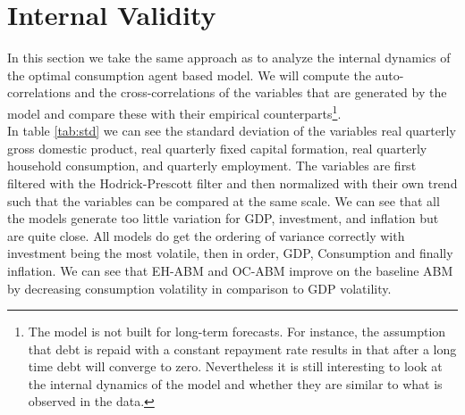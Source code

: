 
\section{Internal Validity} %

\label{Sensitivity Analysis} %
In this section we take the same approach as \cite{caiani_agent_2016} to analyze the internal dynamics of the optimal consumption agent based model. We will compute the auto-correlations and the cross-correlations of the variables that are generated by the model and compare these with their empirical counterparts\footnote{The model is not built for long-term forecasts. For instance, the assumption that debt is repaid with a constant repayment rate results in that after a long time debt will converge to zero. Nevertheless it is still interesting to look at the internal dynamics of the model and whether they are similar to what is observed in the data.}. \\

In table \ref{tab:std} we can see the standard deviation of the variables real quarterly gross domestic product, real quarterly fixed capital formation, real quarterly household consumption, and quarterly employment. The variables are first filtered with the Hodrick-Prescott filter and then normalized with their own trend such that the variables can be compared at the same scale. We can see that all the models generate too little variation for GDP, investment, and inflation but are quite close. All models do get the ordering of variance correctly with investment being the most volatile, then in order, GDP, Consumption and finally inflation. We can see that EH-ABM and OC-ABM improve on the baseline ABM by decreasing consumption volatility in comparison to GDP volatility.

